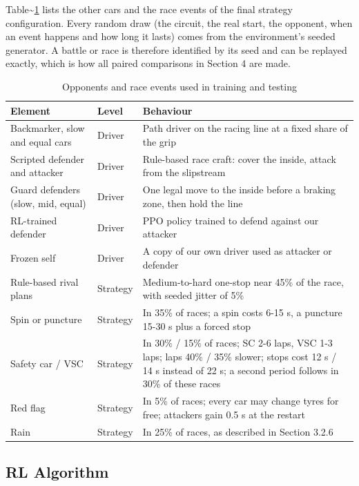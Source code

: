 \documentclass{ieeeaccess}
\begin{document}
Table\textasciitilde{}\ref{tab:4} lists the other cars and the race events of the final strategy configuration. Every random draw (the circuit, the
real start, the opponent, when an event happens and how long it lasts) comes from
the environment's seeded generator. A battle or race is therefore identified by its
seed and can be replayed exactly, which is how all paired comparisons in Section 4
are made.

\begin{table}[!t]
\caption{Opponents and race events used in training and testing}
\label{tab:4}
\centering\footnotesize
\begin{tabularx}{\columnwidth}{>{\raggedright\arraybackslash}X>{\raggedright\arraybackslash}X>{\raggedright\arraybackslash}X}
\hline
\textbf{Element} & \textbf{Level} & \textbf{Behaviour} \\
\hline
Backmarker, slow and equal cars & Driver & Path driver on the racing line at a fixed share of the grip \\
Scripted defender and attacker & Driver & Rule-based race craft: cover the inside, attack from the slipstream \\
Guard defenders (slow, mid, equal) & Driver & One legal move to the inside before a braking zone, then hold the line \\
RL-trained defender & Driver & PPO policy trained to defend against our attacker \\
Frozen self & Driver & A copy of our own driver used as attacker or defender \\
Rule-based rival plans & Strategy & Medium-to-hard one-stop near 45\% of the race, with seeded jitter of 5\% \\
Spin or puncture & Strategy & In 35\% of races; a spin costs 6-15 s, a puncture 15-30 s plus a forced stop \\
Safety car / VSC & Strategy & In 30\% / 15\% of races; SC 2-6 laps, VSC 1-3 laps; laps 40\% / 35\% slower; stops cost 12 s / 14 s instead of 22 s; a second period follows in 30\% of these races \\
Red flag & Strategy & In 5\% of races; every car may change tyres for free; attackers gain 0.5 s at the restart \\
Rain & Strategy & In 25\% of races, as described in Section 3.2.6 \\
\hline
\end{tabularx}
\end{table}

\subsection{RL Algorithm}
\end{document}
